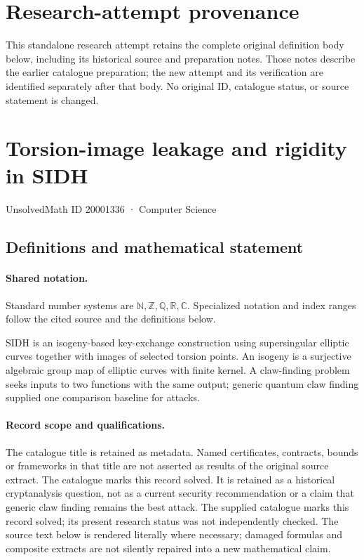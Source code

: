 \documentclass[11pt]{article}
\begin{document}
\section*{Research-attempt provenance}
This standalone research attempt retains the complete original definition body below,
including its historical source and preparation notes. Those notes describe the
earlier catalogue preparation; the new attempt and its verification are identified
separately after that body. No original ID, catalogue status, or source statement is changed.

\section{Torsion-image leakage and rigidity in SIDH}\label{20001336}
{\small UnsolvedMath ID 20001336 · Computer Science}
\subsection{Definitions and mathematical statement}

\paragraph{Shared notation.}Standard number systems are $\mathbb N,\mathbb Z,\mathbb Q,\mathbb R,\mathbb C$. Specialized notation and index ranges follow the cited source and the definitions below.


SIDH is an isogeny-based key-exchange construction using supersingular elliptic curves together with images of selected torsion points. An isogeny is a surjective algebraic group map of elliptic curves with finite kernel. A claw-finding problem seeks inputs to two functions with the same output; generic quantum claw finding supplied one comparison baseline for attacks.
\paragraph{Record scope and qualifications.}
The catalogue title is retained as metadata. Named certificates, contracts, bounds or frameworks in that title are not asserted as results of the original source extract.
The catalogue marks this record solved. It is retained as a historical cryptanalysis question, not as a current security recommendation or a claim that generic claw finding remains the best attack. The supplied catalogue marks this record solved; its present research status was not independently checked.
The source text below is rendered literally where necessary; damaged formulas and composite extracts are not silently repaired into a new mathematical claim.
\end{document}
